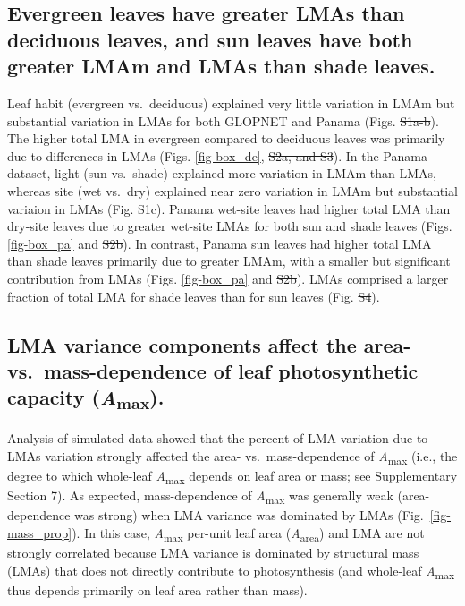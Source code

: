 \documentclass[
  12pt,
  letterpaper,
  DIV=11,
  numbers=noendperiod]{scrartcl}
\providecommand{\DIFadd}[1]{{\protect\color{blue}\uwave{#1}}} %
\providecommand{\DIFdel}[1]{{\protect\color{red}\sout{#1}}}                      %
\providecommand{\DIFaddbegin}{} %
\providecommand{\DIFaddend}{} %
\providecommand{\DIFdelbegin}{} %
\providecommand{\DIFdelend}{} %
\newcommand{\DIFscaledelfig}{0.5}
\newlength{\DIFdelgraphicswidth} %
\newlength{\DIFdelgraphicsheight} %
\newcommand{\DIFaddincludegraphics}[2][]{{\color{blue}\fbox{\DIFOincludegraphics[#1]{#2}}}} %
\newcommand{\DIFdelincludegraphics}[2][]{%
\sbox{\DIFdelgraphicsbox}{\DIFOincludegraphics[#1]{#2}}%
\settoboxwidth{\DIFdelgraphicswidth}{\DIFdelgraphicsbox} %
\settoboxtotalheight{\DIFdelgraphicsheight}{\DIFdelgraphicsbox} %
\scalebox{\DIFscaledelfig}{%
\parbox[b]{\DIFdelgraphicswidth}{\usebox{\DIFdelgraphicsbox}\\[-\baselineskip] \rule{\DIFdelgraphicswidth}{0em}}\llap{\resizebox{\DIFdelgraphicswidth}{\DIFdelgraphicsheight}{%
\setlength{\unitlength}{\DIFdelgraphicswidth}%
\begin{picture}(1,1)%
\thicklines\linethickness{2pt} %
{\color[rgb]{1,0,0}\put(0,0){\framebox(1,1){}}}%
{\color[rgb]{1,0,0}\put(0,0){\line( 1,1){1}}}%
{\color[rgb]{1,0,0}\put(0,1){\line(1,-1){1}}}%
\end{picture}%
}\hspace*{3pt}}} %
} %
\DeclareRobustCommand{\DIFaddbegin}{\DIFOaddbegin \let\includegraphics\DIFaddincludegraphics} %
\DeclareRobustCommand{\DIFaddend}{\DIFOaddend \let\includegraphics\DIFOincludegraphics} %
\DeclareRobustCommand{\DIFdelbegin}{\DIFOdelbegin \let\includegraphics\DIFdelincludegraphics} %
\DeclareRobustCommand{\DIFdelend}{\DIFOaddend \let\includegraphics\DIFOincludegraphics} %
\begin{document}
\subsection{Evergreen leaves have greater LMAs than deciduous leaves,
and sun leaves have both greater LMAm and LMAs than shade
leaves.}\label{evergreen-leaves-have-greater-lmas-than-deciduous-leaves-and-sun-leaves-have-both-greater-lmam-and-lmas-than-shade-leaves.}

Leaf habit (evergreen vs.~deciduous) explained very little variation in
LMAm but substantial variation in LMAs for both GLOPNET and Panama
(Figs. \DIFdelbegin \DIFdel{S1a-b}\DIFdelend \DIFaddbegin \DIFadd{S2a-b}\DIFaddend ). The higher total LMA in evergreen compared to deciduous
leaves was primarily due to differences in LMAs (Figs. \ref{fig-box_de},
\DIFdelbegin \DIFdel{S2a, and S3}\DIFdelend \DIFaddbegin \DIFadd{S3a, and S4}\DIFaddend ). In the Panama dataset, light (sun vs.~shade) explained
more variation in LMAm than LMAs, whereas site (wet vs.~dry) explained
near zero variation in LMAm but substantial variaion in LMAs (Fig. \DIFdelbegin \DIFdel{S1c}\DIFdelend \DIFaddbegin \DIFadd{S2c}\DIFaddend ).
Panama wet-site leaves had higher total LMA than dry-site leaves due to
greater wet-site LMAs for both sun and shade leaves (Figs.
\ref{fig-box_pa} and \DIFdelbegin \DIFdel{S2b}\DIFdelend \DIFaddbegin \DIFadd{S3b}\DIFaddend ). In contrast, Panama sun leaves had higher
total LMA than shade leaves primarily due to greater LMAm, with a
smaller but significant contribution from LMAs (Figs. \ref{fig-box_pa}
and \DIFdelbegin \DIFdel{S2b}\DIFdelend \DIFaddbegin \DIFadd{S3b}\DIFaddend ). LMAs comprised a larger fraction of total LMA for shade leaves
than for sun leaves (Fig. \DIFdelbegin \DIFdel{S4}\DIFdelend \DIFaddbegin \DIFadd{S5}\DIFaddend ).

\subsection{\texorpdfstring{LMA variance components affect the area-
vs.~mass-dependence of leaf photosynthetic capacity
(\emph{A}\textsubscript{max}).}{LMA variance components affect the area- vs.~mass-dependence of leaf photosynthetic capacity (Amax).}}\label{lma-variance-components-affect-the-area--vs.-mass-dependence-of-leaf-photosynthetic-capacity-amax.}

Analysis of simulated data showed that the percent of LMA variation due
to LMAs variation strongly affected the area- vs.~mass-dependence of
\emph{A}\textsubscript{max} (i.e., the degree to which whole-leaf
\emph{A}\textsubscript{max} depends on leaf area or mass; see
Supplementary Section 7). As expected, mass-dependence of
\emph{A}\textsubscript{max} was generally weak (area-dependence was
strong) when LMA variance was dominated by LMAs
(Fig.~\ref{fig-mass_prop}). In this case, \emph{A}\textsubscript{max}
per-unit leaf area (\emph{A}\textsubscript{area}) and LMA are not
strongly correlated because LMA variance is dominated by structural mass
(LMAs) that does not directly contribute to photosynthesis (and
whole-leaf \emph{A}\textsubscript{max} thus depends primarily on leaf
area rather than mass).
\end{document}
